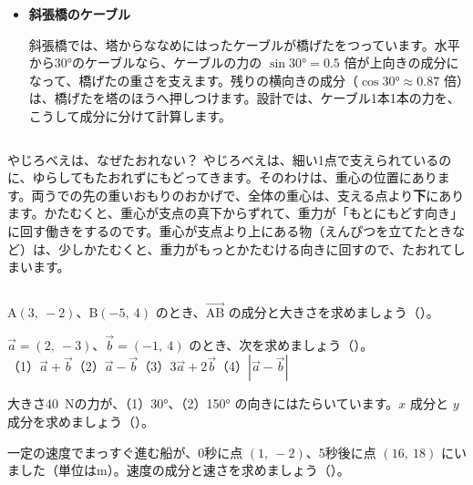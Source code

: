 \begin{butsuri}
\begin{itemize}[leftmargin=1.2\zw, itemsep=2pt, topsep=0pt, label={\color{bkPurple}●}]
コンピュータゲームでは、ボールの位置を、1秒に60回（1コマ $\dfrac{1}{60}$ 秒ごとに）計算しなおします。1コマごとに、位置に「速度×$\dfrac{1}{60}$」をたします。速度が $(3,\ 4)$ なら、1コマで $(0.05,\ 0.0667)$ ずつ進みます。$\vec{p}=\vec{p}_0+t\vec{v}$ を、少しずつ計算しているのです。
\item \textbf{斜張橋のケーブル}\par
斜張橋では、塔からななめにはったケーブルが橋げたをつっています。水平から30°のケーブルなら、ケーブルの力の $\sin30°=0.5$ 倍が上向きの成分になって、橋げたの重さを支えます。残りの横向きの成分（$\cos30°\approx0.87$ 倍）は、橋げたを塔のほうへ押しつけます。設計では、ケーブル1本1本の力を、こうして成分に分けて計算します。
\end{itemize}
\end{butsuri}

\begin{column}{やじろべえは、なぜたおれない？}
やじろべえは、細い1点で支えられているのに、ゆらしてもたおれずにもどってきます。そのわけは、重心の位置にあります。両うでの先の重いおもりのおかげで、全体の重心は、支える点より\textbf{下}にあります。かたむくと、重心が支点の真下からずれて、重力が「もとにもどす向き」に回す働きをするのです。重心が支点より上にある物（えんぴつを立てたときなど）は、少しかたむくと、重力がもっとかたむける向きに回すので、たおれてしまいます。
\end{column}

\bkendproblems
{}

\bkproblem $\mathrm{A}(3,\ -2)$、$\mathrm{B}(-5,\ 4)$ のとき、$\overrightarrow{\mathrm{AB}}$ の成分と大きさを求めましょう（）。

\bkproblem $\vec{a}=(2,\ -3)$、$\vec{b}=(-1,\ 4)$ のとき、次を求めましょう（）。\\
（1）$\vec{a}+\vec{b}$\quad（2）$\vec{a}-\vec{b}$\quad（3）$3\vec{a}+2\vec{b}$\quad（4）$|\vec{a}-\vec{b}|$

\bkproblem 大きさ\qty{40}{N}の力が、（1）30°、（2）150° の向きにはたらいています。$x$ 成分と $y$ 成分を求めましょう（）。

\bkproblem 一定の速度でまっすぐ進む船が、0秒に点 $(1,\ -2)$、5秒後に点 $(16,\ 18)$ にいました（単位はm）。速度の成分と速さを求めましょう（）。

